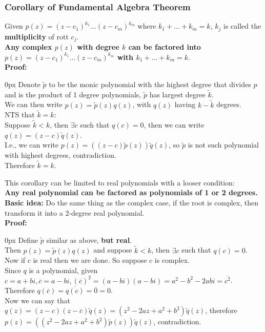 \documentclass{article}
\begin{document}
\subsubsection*{Corollary of Fundamental Algebra Theorem}
Given $p(z) = (z-c_1)^{k_1} ... (z-c_m)^{k_m}$ where $k_1 + ... + k_m = k$, $k_j$ is called the \textbf{multiplicity} of rott $c_j$.\\
\textbf{Any complex $p(z)$ with degree $k$ can be factored into $p(z) = (z-c_1)^{k_1} ... (z-c_m)^{k_m}$ with $k_1 + ... + k_m = k$}.\\
\textbf{Proof:}
\begin{addmargin}[10px]{0px}
    Denote $\tilde{p}$ to be the monic polynomial with the highest degree that divides $p$ and is the product of 1 degree polynomials, $\tilde{p}$ has largest degree $\tilde{k}$.\\
    We can then write $p(z) = \tilde{p}(z)q(z)$, with $q(z)$ having $k-\tilde{k}$ degrees.\\
    NTS that $\tilde{k} = k$:\\
    Suppose $\tilde{k} < k$, then $\exists c$ such that $q(c) = 0$, then we can write $q(z) = (z-c)\tilde{q}(z)$.\\
    I.e., we can write $p(z) = ((z-c)\tilde{p}(z))\tilde{q}(z)$, so $\tilde{p}$ is not such polynomial with highest degrees, contradiction.\\
    Therefore $\tilde{k} = k$.
\end{addmargin}
This corollary can be limited to real polynomials with a looser condition:\\
\textbf{Any real polynomial can be factored as polynomials of 1 or 2 degrees.}\\
\textbf{Basic idea:}
Do the same thing as the complex case, if the root is complex, then transform it into a 2-degree real polynomial.\\
\textbf{Proof:}
\begin{addmargin}[10px]{0px}
    Define $\tilde{p}$ similar as above, \textbf{but real}.\\
    Then $p(z) = \tilde{p}(z)q(z)$ and suppose $\tilde{k} < k$, then $\exists c$ such that $q(c) = 0$.\\
    Now if $c$ is real then we are done. So suppose $c$ is complex.\\
    Since $q$ is a polynomial, given $c = a + b i, \overline{c} = a - bi, (\overline{c})^2 = (a-bi)(a-bi) = a^2 - b^2 - 2abi = \overline{c^2}$. Therefore $q(\overline{c}) = \overline{q(c)} = \overline{0} = 0$.\\
    Now we can say that $q(z) = (z-c)(z-\overline{c})\tilde{q}(z) = (z^2 - 2az + a^2 + b^2)\tilde{q}(z)$, therefore $p(z) = ((z^2 - 2az + a^2 + b^2)\tilde{p}(z))\tilde{q}(z)$, contradiction.
\end{addmargin}
\end{document}

